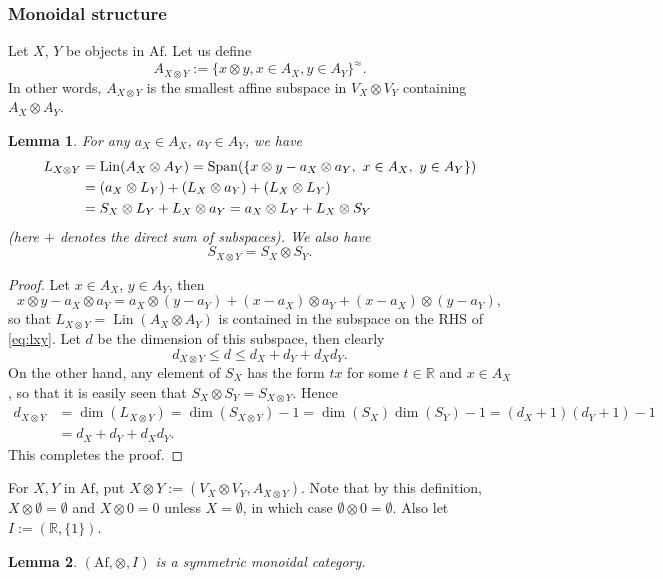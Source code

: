 \documentclass[12pt]{article}
\newtheorem{lemma}{Lemma}
\theoremstyle{definition}
\theoremstyle{remark}
\def\lin{\operatorname{Lin}}
\def\Span{\operatorname{Span}}
\def \Af{\mathrm{Af}}
\begin{document}
\subsubsection{Monoidal structure}

Let $X$, $Y$ be objects in $\Af$. Let us define
\[
A_{X\otimes Y}:=\{x\otimes y, x\in A_X, y\in A_Y\}^{\approx}.
\]
In other words, $A_{X\otimes Y}$ is the smallest affine subspace in $V_X\otimes V_Y$ containing
$A_X\otimes A_Y$. 

\begin{lemma}\label{lemma:tensor_spaces}
For any $a_X\in A_X$, $a_Y\in A_Y$, we  have
\begin{align}
L_{X\otimes Y}&=\lin(A_X\otimes A_Y)=\Span(\{x\otimes y-a_X\otimes a_Y,\ x\in A_X,\ y\in
A_Y\})\notag\\
&= (a_X\otimes L_Y)+ (L_X\otimes a_Y)+ (L_X\otimes L_Y)\label{eq:lxy}\\
&= S_X\otimes L_Y+L_X\otimes a_Y=a_X\otimes L_Y+L_X\otimes S_Y
\end{align}
(here $+$ denotes the direct sum of subspaces). We also have
\[
S_{X\otimes Y}=S_X\otimes S_Y.
\]
\end{lemma}

\begin{proof} Let $x\in A_X$, $y\in A_Y$, then
\[
x\otimes y-a_X\otimes a_Y=a_X\otimes (y-a_Y)+(x-a_X)\otimes a_Y+(x-a_X)\otimes (y-a_Y),
\]
so that $L_{X\otimes Y}=\lin(A_X\otimes A_Y)$ is contained in the subspace on the RHS of \eqref{eq:lxy}.
Let $d$ be the dimension of this subspace, then clearly
\[
d_{X\otimes Y}\le d\le d_X+d_Y+d_Xd_Y.
\]
On the other hand, any element of $S_X$ has the form $tx$ for some $t\in \mathbb R$ and
$x\in A_X$, so that it is easily seen that $S_X\otimes S_Y=S_{X\otimes Y}$. 
Hence 
\begin{align*}
d_{X\otimes Y}&=\dim(L_{X\otimes Y})=\dim(S_{X\otimes
Y})-1=\dim(S_X)\dim(S_Y)-1=(d_X+1)(d_Y+1)-1\\
&=d_X+d_Y+d_Xd_Y.
\end{align*}
This completes the proof.

\end{proof}



For $X,Y$ in $\Af$, put $X\otimes Y:=(V_X\otimes V_Y,A_{X\otimes Y})$.
Note that by this definition, $X\otimes \emptyset =\emptyset$ and
$X\otimes 0=0$ unless $X=\emptyset$, in which case $\emptyset\otimes 0=\emptyset$. 
Also let $I:=(\mathbb R, \{1\})$. 


\begin{lemma}\label{lemma:monoidal}
$(\Af,\otimes, I)$ is a symmetric
monoidal category.
\end{lemma}
\end{document}
